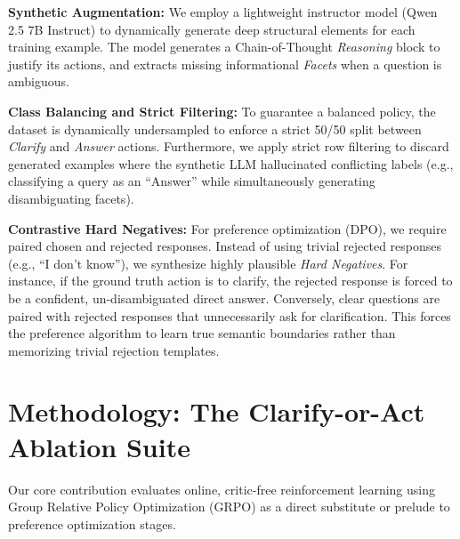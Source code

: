 \documentclass{article}
\theoremstyle{plain}
\theoremstyle{definition}
\theoremstyle{remark}
\begin{document}
\textbf{Synthetic Augmentation:} We employ a lightweight instructor model (Qwen 2.5 7B Instruct) to dynamically generate deep structural elements for each training example. The model generates a Chain-of-Thought \emph{Reasoning} block to justify its actions, and extracts missing informational \emph{Facets} when a question is ambiguous. 

\textbf{Class Balancing and Strict Filtering:} To guarantee a balanced policy, the dataset is dynamically undersampled to enforce a strict 50/50 split between \emph{Clarify} and \emph{Answer} actions. Furthermore, we apply strict row filtering to discard generated examples where the synthetic LLM hallucinated conflicting labels (e.g., classifying a query as an ``Answer'' while simultaneously generating disambiguating facets).

\textbf{Contrastive Hard Negatives:} For preference optimization (DPO), we require paired chosen and rejected responses. Instead of using trivial rejected responses (e.g., ``I don't know''), we synthesize highly plausible \emph{Hard Negatives}. For instance, if the ground truth action is to clarify, the rejected response is forced to be a confident, un-disambiguated direct answer. Conversely, clear questions are paired with rejected responses that unnecessarily ask for clarification. This forces the preference algorithm to learn true semantic boundaries rather than memorizing trivial rejection templates.

\section{Methodology: The Clarify-or-Act Ablation Suite}
Our core contribution evaluates online, critic-free reinforcement learning using Group Relative Policy Optimization (GRPO) as a direct substitute or prelude to preference optimization stages.
\end{document}
